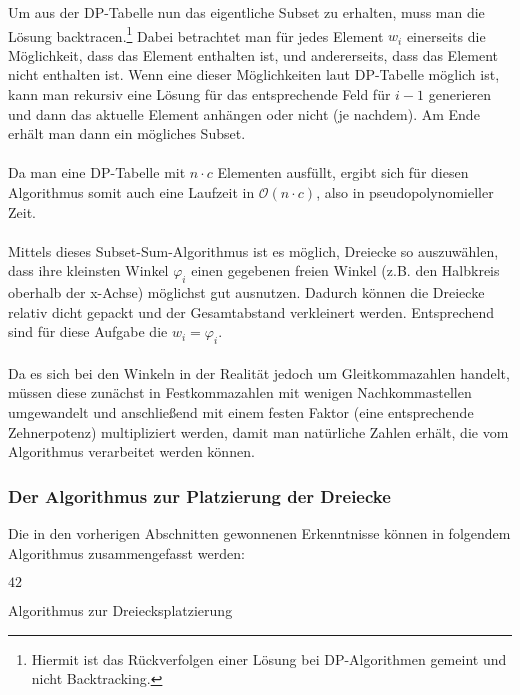 \documentclass[a4paper, notitlepage, 12pt]{scrartcl}
\begin{document}
  Um aus der DP-Tabelle nun das eigentliche Subset zu erhalten, muss man die Lösung backtracen.\footnote{Hiermit ist das Rückverfolgen einer Lösung bei DP-Algorithmen gemeint und nicht Backtracking.}\cite{Src:dpbacktrace} Dabei betrachtet man für jedes Element $w_i$ einerseits die Möglichkeit, dass das Element enthalten ist, und andererseits, dass das Element nicht enthalten ist. Wenn eine dieser Möglichkeiten laut DP-Tabelle möglich ist, kann man rekursiv eine Lösung für das entsprechende Feld für $i-1$ generieren und dann das aktuelle Element anhängen oder nicht (je nachdem). Am Ende erhält man dann ein mögliches Subset.
  \\ \\
  Da man eine DP-Tabelle mit $n \cdot c$ Elementen ausfüllt, ergibt sich für diesen Algorithmus somit auch eine Laufzeit in $\mathcal{O}(n \cdot c)$, also in pseudopolynomieller Zeit.
  \\ \\
  Mittels dieses Subset-Sum-Algorithmus ist es möglich, Dreiecke so auszuwählen, dass ihre kleinsten Winkel $\varphi_i$ einen gegebenen freien Winkel (z.B. den Halbkreis oberhalb der x-Achse) möglichst gut ausnutzen. Dadurch können die Dreiecke relativ dicht gepackt und der Gesamtabstand verkleinert werden. Entsprechend sind für diese Aufgabe die $w_i = \varphi_i$. \\ \\
   Da es sich bei den Winkeln in der Realität jedoch um Gleitkommazahlen handelt, müssen diese zunächst in Festkommazahlen mit wenigen Nachkommastellen umgewandelt und anschließend mit einem festen Faktor (eine entsprechende Zehnerpotenz) multipliziert werden, damit man natürliche Zahlen erhält, die vom Algorithmus verarbeitet werden können.
  \subsubsection{Der Algorithmus zur Platzierung der Dreiecke}
  Die in den vorherigen Abschnitten gewonnenen Erkenntnisse können in folgendem Algorithmus zusammengefasst werden:
  \begin{algorithm}[H]
  	\begin{algorithmic}
  		\State \Return $42$
  		\EndFunction
  	\end{algorithmic}
  	\caption{Algorithmus zur Dreiecksplatzierung}
  \end{algorithm}
\end{document}
